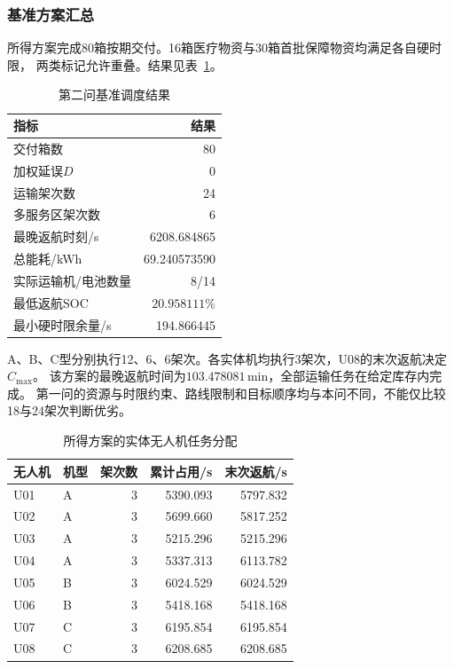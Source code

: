 \documentclass[bwprint]{gmcmthesis}
\begin{document}
\subsubsection{基准方案汇总}
所得方案完成80箱按期交付。16箱医疗物资与30箱首批保障物资均满足各自硬时限，
两类标记允许重叠。结果见表~\ref{tab:q2_summary}。
\begin{table}[htbp]
\centering
\small
\caption{第二问基准调度结果}
\label{tab:q2_summary}
\begin{tabular}{lr}
\toprule
指标 & 结果 \\
\midrule
交付箱数 & 80 \\
加权延误$D$ & 0 \\
运输架次数 & 24 \\
多服务区架次数 & 6 \\
最晚返航时刻/s & 6208.684865 \\
总能耗/kWh & 69.240573590 \\
实际运输机/电池数量 & 8/14 \\
最低返航SOC & $20.958111\%$ \\
最小硬时限余量/s & 194.866445 \\
\bottomrule
\end{tabular}
\end{table}
A、B、C型分别执行12、6、6架次。各实体机均执行3架次，U08的末次返航决定$C_{\max}$。
该方案的最晚返航时间为$103.478081\,\mathrm{min}$，全部运输任务在给定库存内完成。
第一问的资源与时限约束、路线限制和目标顺序均与本问不同，不能仅比较18与24架次判断优劣。
\begin{table}[htbp]
\centering
\small
\caption{所得方案的实体无人机任务分配}
\label{tab:q2_units}
\begin{tabular}{llrrr}
\toprule
无人机 & 机型 & 架次数 & 累计占用/s & 末次返航/s \\
\midrule
U01 & A & 3 & 5390.093 & 5797.832 \\
U02 & A & 3 & 5699.660 & 5817.252 \\
U03 & A & 3 & 5215.296 & 5215.296 \\
U04 & A & 3 & 5337.313 & 6113.782 \\
U05 & B & 3 & 6024.529 & 6024.529 \\
U06 & B & 3 & 5418.168 & 5418.168 \\
U07 & C & 3 & 6195.854 & 6195.854 \\
U08 & C & 3 & 6208.685 & 6208.685 \\
\bottomrule
\end{tabular}
\end{table}
\end{document}
